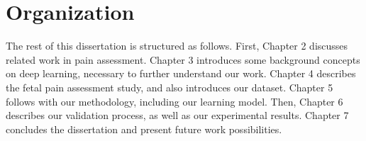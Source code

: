 \section{Organization}

The rest of this dissertation is structured as follows. First, Chapter 2 discusses related work in pain assessment. Chapter 3 introduces some background concepts on deep learning, necessary to further understand our work. Chapter 4 describes the fetal pain assessment study, and also introduces our dataset. Chapter 5 follows with our methodology, including our learning model. Then, Chapter 6 describes our validation process, as well as our experimental results. Chapter 7 concludes the dissertation and present future work possibilities.
